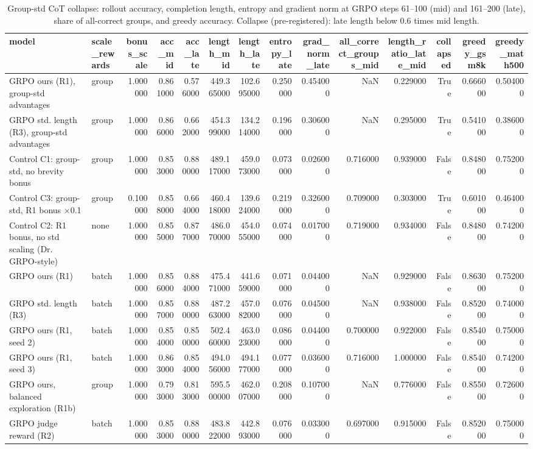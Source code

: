 \begin{table}
\caption{Group-std CoT collapse: rollout accuracy, completion length, entropy and gradient norm at GRPO steps 61--100 (mid) and 161--200 (late), share of all-correct groups, and greedy accuracy. Collapse (pre-registered): late length below 0.6 times mid length.}
\label{tab:mechanism}
\begin{tabular}{llrrrrrrrrrrrr}
\toprule
model & scale_rewards & bonus_scale & acc_mid & acc_late & length_mid & length_late & entropy_late & grad_norm_late & all_correct_groups_mid & length_ratio_late_mid & collapsed & greedy_gsm8k & greedy_math500 \\
\midrule
GRPO ours (R1), group-std advantages & group & 1.000000 & 0.861000 & 0.576000 & 449.365000 & 102.695000 & 0.250000 & 0.454000 & NaN & 0.229000 & True & 0.666000 & 0.504000 \\
GRPO std. length (R3), group-std advantages & group & 1.000000 & 0.866000 & 0.662000 & 454.399000 & 134.214000 & 0.196000 & 0.306000 & NaN & 0.295000 & True & 0.541000 & 0.386000 \\
Control C1: group-std, no brevity bonus & group & 1.000000 & 0.853000 & 0.880000 & 489.117000 & 459.073000 & 0.073000 & 0.026000 & 0.716000 & 0.939000 & False & 0.848000 & 0.752000 \\
Control C3: group-std, R1 bonus ×0.1 & group & 0.100000 & 0.858000 & 0.664000 & 460.418000 & 139.624000 & 0.219000 & 0.326000 & 0.709000 & 0.303000 & True & 0.601000 & 0.464000 \\
Control C2: R1 bonus, no std scaling (Dr. GRPO-style) & none & 1.000000 & 0.855000 & 0.877000 & 486.070000 & 454.055000 & 0.074000 & 0.017000 & 0.719000 & 0.934000 & False & 0.848000 & 0.742000 \\
GRPO ours (R1) & batch & 1.000000 & 0.856000 & 0.884000 & 475.471000 & 441.659000 & 0.071000 & 0.044000 & NaN & 0.929000 & False & 0.863000 & 0.752000 \\
GRPO std. length (R3) & batch & 1.000000 & 0.857000 & 0.880000 & 487.263000 & 457.082000 & 0.076000 & 0.045000 & NaN & 0.938000 & False & 0.852000 & 0.740000 \\
GRPO ours (R1, seed 2) & batch & 1.000000 & 0.854000 & 0.850000 & 502.460000 & 463.023000 & 0.086000 & 0.044000 & 0.700000 & 0.922000 & False & 0.854000 & 0.750000 \\
GRPO ours (R1, seed 3) & batch & 1.000000 & 0.863000 & 0.854000 & 494.056000 & 494.177000 & 0.077000 & 0.036000 & 0.716000 & 1.000000 & False & 0.854000 & 0.742000 \\
GRPO ours, balanced exploration (R1b) & group & 1.000000 & 0.793000 & 0.813000 & 595.500000 & 462.007000 & 0.208000 & 0.107000 & NaN & 0.776000 & False & 0.855000 & 0.726000 \\
GRPO judge reward (R2) & batch & 1.000000 & 0.853000 & 0.880000 & 483.822000 & 442.893000 & 0.076000 & 0.033000 & 0.697000 & 0.915000 & False & 0.852000 & 0.750000 \\
\bottomrule
\end{tabular}
\end{table}
